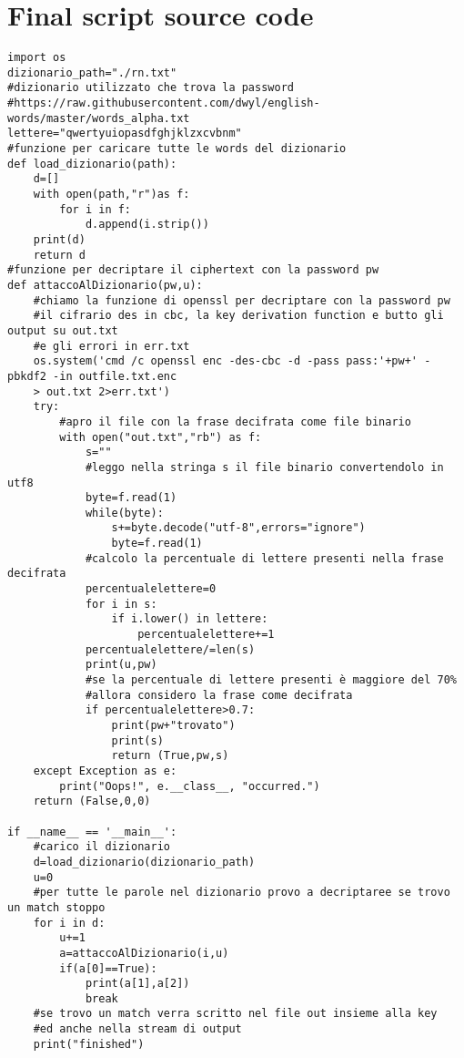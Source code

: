 \documentclass{article}
\begin{document}
\section{Final script source code}
\begin{verbatim}
import os
dizionario_path="./rn.txt"
#dizionario utilizzato che trova la password 
#https://raw.githubusercontent.com/dwyl/english-words/master/words_alpha.txt
lettere="qwertyuiopasdfghjklzxcvbnm"
#funzione per caricare tutte le words del dizionario
def load_dizionario(path):
    d=[]
    with open(path,"r")as f:
        for i in f:
            d.append(i.strip())
    print(d)
    return d
#funzione per decriptare il ciphertext con la password pw
def attaccoAlDizionario(pw,u):
    #chiamo la funzione di openssl per decriptare con la password pw
    #il cifrario des in cbc, la key derivation function e butto gli output su out.txt
    #e gli errori in err.txt
    os.system('cmd /c openssl enc -des-cbc -d -pass pass:'+pw+' -pbkdf2 -in outfile.txt.enc
    > out.txt 2>err.txt')
    try:
        #apro il file con la frase decifrata come file binario
        with open("out.txt","rb") as f:
            s=""
            #leggo nella stringa s il file binario convertendolo in utf8
            byte=f.read(1)
            while(byte):
                s+=byte.decode("utf-8",errors="ignore")
                byte=f.read(1)
            #calcolo la percentuale di lettere presenti nella frase decifrata
            percentualelettere=0
            for i in s:
                if i.lower() in lettere:
                    percentualelettere+=1
            percentualelettere/=len(s)
            print(u,pw)
            #se la percentuale di lettere presenti è maggiore del 70%
            #allora considero la frase come decifrata
            if percentualelettere>0.7:
                print(pw+"trovato")
                print(s)
                return (True,pw,s)
    except Exception as e:
        print("Oops!", e.__class__, "occurred.")   
    return (False,0,0)
    
if __name__ == '__main__':
    #carico il dizionario
    d=load_dizionario(dizionario_path)
    u=0
    #per tutte le parole nel dizionario provo a decriptaree se trovo un match stoppo
    for i in d:
        u+=1
        a=attaccoAlDizionario(i,u)
        if(a[0]==True):
            print(a[1],a[2])
            break
    #se trovo un match verra scritto nel file out insieme alla key
    #ed anche nella stream di output
    print("finished")
\end{verbatim}
\end{document}
